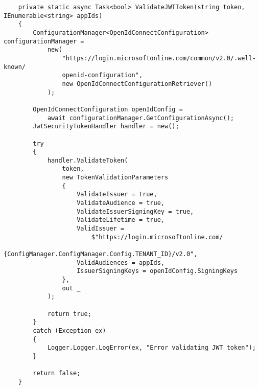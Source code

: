 \begin{lstlisting}
	private static async Task<bool> ValidateJWTToken(string token, IEnumerable<string> appIds)
	{
		ConfigurationManager<OpenIdConnectConfiguration> configurationManager =
			new(
				"https://login.microsoftonline.com/common/v2.0/.well-known/
				openid-configuration",
				new OpenIdConnectConfigurationRetriever()
			);

		OpenIdConnectConfiguration openIdConfig =
			await configurationManager.GetConfigurationAsync();
		JwtSecurityTokenHandler handler = new();

		try
		{
			handler.ValidateToken(
				token,
				new TokenValidationParameters
				{
					ValidateIssuer = true,
					ValidateAudience = true,
					ValidateIssuerSigningKey = true,
					ValidateLifetime = true,
					ValidIssuer =
						$"https://login.microsoftonline.com/
						{ConfigManager.ConfigManager.Config.TENANT_ID}/v2.0",
					ValidAudiences = appIds,
					IssuerSigningKeys = openIdConfig.SigningKeys
				},
				out _
			);

			return true;
		}
		catch (Exception ex)
		{
			Logger.Logger.LogError(ex, "Error validating JWT token");
		}

		return false;
	}
\end{lstlisting}